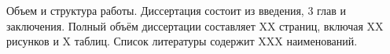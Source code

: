 

{Объем и структура работы.}
Диссертация состоит из введения, 3 глав и
заключения. Полный объём диссертации составляет XX страниц,
включая XX рисунков и X таблиц. Список литературы содержит XXX наименований.